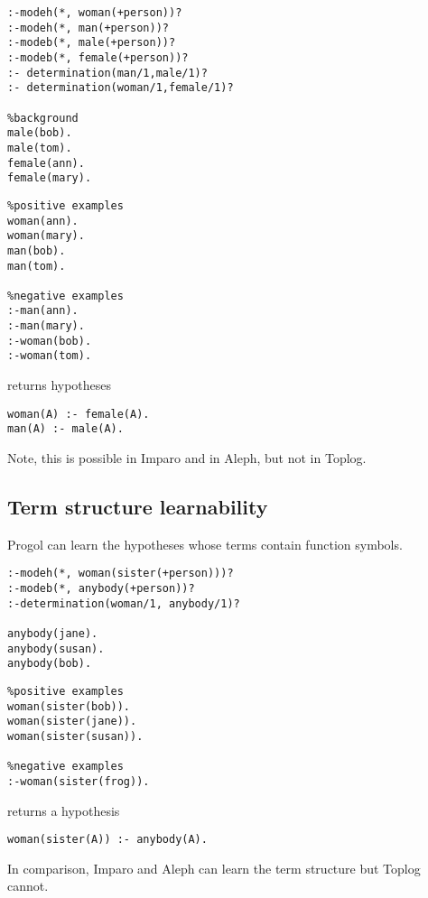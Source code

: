 \begin{minipage}[t]{.60\textwidth}
\begin{lstlisting}
:-modeh(*, woman(+person))?
:-modeh(*, man(+person))?
:-modeb(*, male(+person))?
:-modeb(*, female(+person))?
:- determination(man/1,male/1)?
:- determination(woman/1,female/1)?

%background
male(bob).
male(tom).
female(ann).
female(mary).\end{lstlisting}
\end{minipage}
\begin{minipage}[t]{.20\textwidth}
\begin{lstlisting}
%positive examples
woman(ann).
woman(mary).
man(bob).
man(tom).

%negative examples
:-man(ann).
:-man(mary).
:-woman(bob).
:-woman(tom).
\end{lstlisting}
\end{minipage}

returns hypotheses

\begin{lstlisting}
woman(A) :- female(A).
man(A) :- male(A).
\end{lstlisting}

Note, this is possible in Imparo and in Aleph, but not in Toplog.

\subsection{Term structure learnability}
Progol can learn the hypotheses whose terms contain function symbols.

\begin{minipage}[t]{.60\textwidth}
\begin{lstlisting}
:-modeh(*, woman(sister(+person)))?
:-modeb(*, anybody(+person))?
:-determination(woman/1, anybody/1)?

anybody(jane).
anybody(susan).
anybody(bob).\end{lstlisting}
\end{minipage}
\begin{minipage}[t]{.20\textwidth}
\begin{lstlisting}
%positive examples
woman(sister(bob)).
woman(sister(jane)).
woman(sister(susan)).

%negative examples
:-woman(sister(frog)).
\end{lstlisting}
\end{minipage}

returns a hypothesis
\begin{lstlisting}
woman(sister(A)) :- anybody(A).
\end{lstlisting}
In comparison, Imparo and Aleph can learn the term structure but Toplog cannot.

